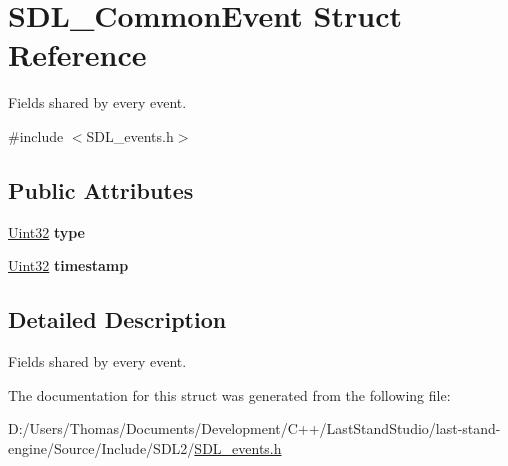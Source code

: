 \hypertarget{structSDL__CommonEvent}{}\section{S\+D\+L\+\_\+\+Common\+Event Struct Reference}
\label{structSDL__CommonEvent}


Fields shared by every event.  




{\ttfamily \#include $<$S\+D\+L\+\_\+events.\+h$>$}

\subsection*{Public Attributes}
\begin{DoxyCompactItemize}
\item 
\hypertarget{structSDL__CommonEvent_a4ecd888325355321b42b2e2956f27453}{}\hyperlink{SDL__stdinc_8h_add440eff171ea5f55cb00c4a9ab8672d}{Uint32} {\bfseries type}\label{structSDL__CommonEvent_a4ecd888325355321b42b2e2956f27453}

\item 
\hypertarget{structSDL__CommonEvent_a7d9046abb021ffc88dd5d32978289e65}{}\hyperlink{SDL__stdinc_8h_add440eff171ea5f55cb00c4a9ab8672d}{Uint32} {\bfseries timestamp}\label{structSDL__CommonEvent_a7d9046abb021ffc88dd5d32978289e65}

\end{DoxyCompactItemize}


\subsection{Detailed Description}
Fields shared by every event. 

The documentation for this struct was generated from the following file\+:\begin{DoxyCompactItemize}
\item 
D\+:/\+Users/\+Thomas/\+Documents/\+Development/\+C++/\+Last\+Stand\+Studio/last-\/stand-\/engine/\+Source/\+Include/\+S\+D\+L2/\hyperlink{SDL__events_8h}{S\+D\+L\+\_\+events.\+h}\end{DoxyCompactItemize}
